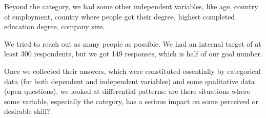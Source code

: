 \documentclass{sigchi}
\begin{document}
Beyond the category, we had some other independent variables, like age, country of employment, country where people got their degree, highest completed education degree, company size.

We tried to reach out as many people as possible. We had an internal target of at least 300 respondents, but we got 149 responses, which is half of our goal number. 

Once we collected their answers, which were constituted essentially by categorical data (for both dependent and independent variables) and some qualitative data (open questions), we looked at differential patterns: are there situations where some variable, especially the category, has a serious impact on some perceived or desirable skill?
%
%
%
\end{document}
